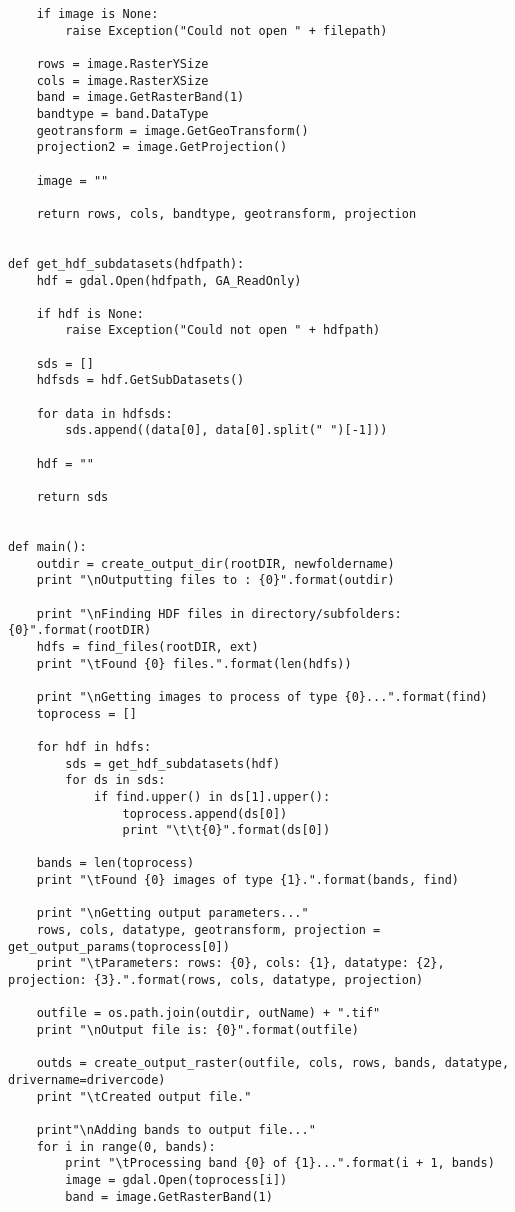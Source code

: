 \begin{verbatim}
    if image is None:
        raise Exception("Could not open " + filepath)

    rows = image.RasterYSize
    cols = image.RasterXSize
    band = image.GetRasterBand(1)
    bandtype = band.DataType
    geotransform = image.GetGeoTransform()
    projection2 = image.GetProjection()

    image = ""

    return rows, cols, bandtype, geotransform, projection


def get_hdf_subdatasets(hdfpath):
    hdf = gdal.Open(hdfpath, GA_ReadOnly)

    if hdf is None:
        raise Exception("Could not open " + hdfpath)

    sds = []
    hdfsds = hdf.GetSubDatasets()

    for data in hdfsds:
        sds.append((data[0], data[0].split(" ")[-1]))

    hdf = ""

    return sds


def main():
    outdir = create_output_dir(rootDIR, newfoldername)
    print "\nOutputting files to : {0}".format(outdir)

    print "\nFinding HDF files in directory/subfolders: {0}".format(rootDIR)
    hdfs = find_files(rootDIR, ext)
    print "\tFound {0} files.".format(len(hdfs))

    print "\nGetting images to process of type {0}...".format(find)
    toprocess = []

    for hdf in hdfs:
        sds = get_hdf_subdatasets(hdf)
        for ds in sds:
            if find.upper() in ds[1].upper():
                toprocess.append(ds[0])
                print "\t\t{0}".format(ds[0])

    bands = len(toprocess)
    print "\tFound {0} images of type {1}.".format(bands, find)

    print "\nGetting output parameters..."
    rows, cols, datatype, geotransform, projection = get_output_params(toprocess[0])
    print "\tParameters: rows: {0}, cols: {1}, datatype: {2}, projection: {3}.".format(rows, cols, datatype, projection)

    outfile = os.path.join(outdir, outName) + ".tif"
    print "\nOutput file is: {0}".format(outfile)

    outds = create_output_raster(outfile, cols, rows, bands, datatype, drivername=drivercode)
    print "\tCreated output file."

    print"\nAdding bands to output file..."
    for i in range(0, bands):
        print "\tProcessing band {0} of {1}...".format(i + 1, bands)
        image = gdal.Open(toprocess[i])
        band = image.GetRasterBand(1)


\end{verbatim}
